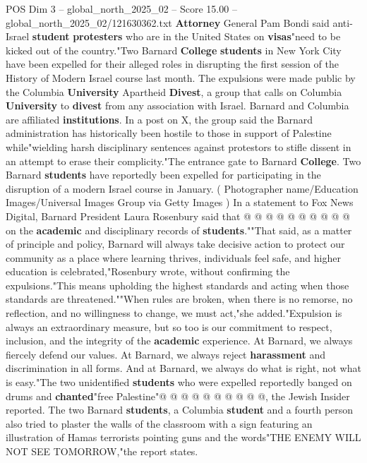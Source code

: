 \begin{textsample}{POS Dim 3 – global\_north\_2025\_02 – Score 15.00 – global\_north\_2025\_02/121630362.txt}  \label{ex:f3_pos_297}
\textbf{Attorney} General Pam Bondi said anti-Israel \textbf{student} \textbf{protesters} who are in the United States on \textbf{visas}"need to be kicked out of the country."Two Barnard \textbf{College} \textbf{students} in New York City have been expelled for their alleged roles in disrupting the first session of the History of Modern Israel course last month.
The expulsions were made public by the Columbia \textbf{University} Apartheid \textbf{Divest}, a group that calls on Columbia \textbf{University} to \textbf{divest} from any association with Israel.
Barnard and Columbia are affiliated \textbf{institutions}.
In a post on X, the group said the Barnard administration has historically been hostile to those in support of Palestine while"wielding harsh disciplinary sentences against protestors to stifle dissent in an attempt to erase their complicity."The entrance gate to Barnard \textbf{College}.
Two Barnard \textbf{students} have reportedly been expelled for participating in the disruption of a modern Israel course in January. ( Photographer name/Education Images/Universal Images Group via Getty Images ) In a statement to Fox News Digital, Barnard President Laura Rosenbury said that @ @ @ @ @ @ @ @ @ @ on the \textbf{academic} and disciplinary records of \textbf{students}.""That said, as a matter of principle and policy, Barnard will always take decisive action to protect our community as a place where learning thrives, individuals feel safe, and higher education is celebrated,"Rosenbury wrote, without confirming the expulsions."This means upholding the highest standards and acting when those standards are threatened.""When rules are broken, when there is no remorse, no reflection, and no willingness to change, we must act,"she added."Expulsion is always an extraordinary measure, but so too is our commitment to respect, inclusion, and the integrity of the \textbf{academic} experience.
At Barnard, we always fiercely defend our values.
At Barnard, we always reject \textbf{harassment} and discrimination in all forms.
And at Barnard, we always do what is right, not what is easy."The two unidentified \textbf{students} who were expelled reportedly banged on drums and \textbf{chanted}"free Palestine"@ @ @ @ @ @ @ @ @ @, the Jewish Insider reported.
The two Barnard \textbf{students}, a Columbia \textbf{student} and a fourth person also tried to plaster the walls of the classroom with a sign featuring an illustration of Hamas terrorists pointing guns and the words"THE ENEMY WILL NOT SEE TOMORROW,"the report states.

\end{textsample}
